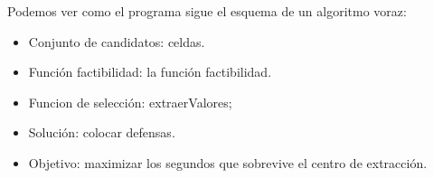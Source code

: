 Podemos ver como el programa sigue el esquema de un algoritmo voraz:
\begin{itemize}

	\item Conjunto de candidatos: celdas.

	\item Función factibilidad: la función factibilidad.

	\item Funcion de selección: extraerValores;

	\item Solución: colocar defensas.

	\item Objetivo: maximizar los segundos que sobrevive el centro de extracción.
	
\end{itemize}


\vspace{5mm}
